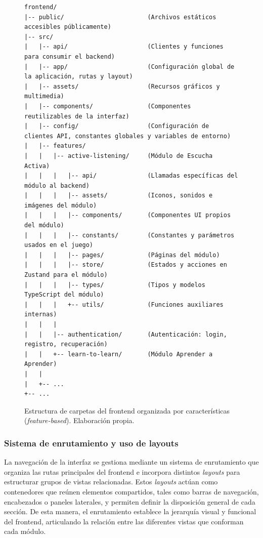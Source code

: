 \begin{figure}[H]
\centering
\begin{verbatim}
frontend/
|-- public/                       (Archivos estáticos accesibles públicamente)
|-- src/
|   |-- api/                      (Clientes y funciones para consumir el backend)
|   |-- app/                      (Configuración global de la aplicación, rutas y layout)
|   |-- assets/                   (Recursos gráficos y multimedia)
|   |-- components/               (Componentes reutilizables de la interfaz)
|   |-- config/                   (Configuración de clientes API, constantes globales y variables de entorno)
|   |-- features/
|   |   |-- active-listening/     (Módulo de Escucha Activa)
|   |   |   |-- api/              (Llamadas específicas del módulo al backend)
|   |   |   |-- assets/           (Iconos, sonidos e imágenes del módulo)
|   |   |   |-- components/       (Componentes UI propios del módulo)
|   |   |   |-- constants/        (Constantes y parámetros usados en el juego)
|   |   |   |-- pages/            (Páginas del módulo)
|   |   |   |-- store/            (Estados y acciones en Zustand para el módulo)
|   |   |   |-- types/            (Tipos y modelos TypeScript del módulo)
|   |   |   +-- utils/            (Funciones auxiliares internas)
|   |   |
|   |   |-- authentication/       (Autenticación: login, registro, recuperación)
|   |   +-- learn-to-learn/       (Módulo Aprender a Aprender)
|   |
|   +-- ...
+-- ...
\end{verbatim}
\caption{Estructura de carpetas del frontend organizada por características (\textit{feature-based}). Elaboración propia.}
\label{fig:frontend-feature-structure}
\end{figure}


\subsubsection{Sistema de enrutamiento y uso de layouts}
La navegación de la interfaz se gestiona mediante un sistema de enrutamiento que organiza las rutas principales del frontend e incorpora distintos \textit{layouts} para estructurar grupos de vistas relacionadas. Estos \textit{layouts} actúan como contenedores que reúnen elementos compartidos, tales como barras de navegación, encabezados o paneles laterales, y permiten definir la disposición general de cada sección. De esta manera, el enrutamiento establece la jerarquía visual y funcional del frontend, articulando la relación entre las diferentes vistas que conforman cada módulo.


